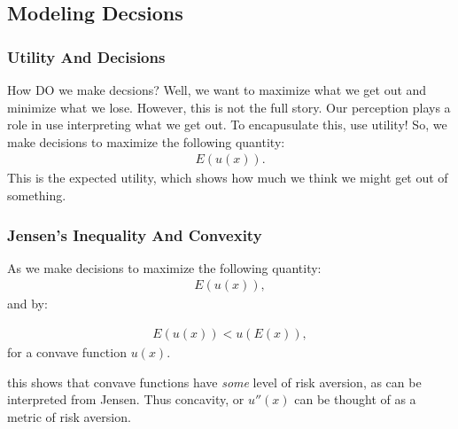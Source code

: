 \documentclass{beamer}
\begin{document}
    \subsection{Modeling Decsions}
        \begin{frame}
            \frametitle{Utility And Decisions}
                How DO we make decsions? Well, we want to maximize what we get out and minimize what we lose. However, this is not the full story. \pause
                Our perception plays a role in use interpreting what we get out. To encapusulate this, use utility! So, we make decisions to maximize the following
                quantity:
                \begin{align*}
                    E(u(x)).
                \end{align*}
                \pause This is the expected utility, which shows how much we think we might get out of something.
        \end{frame}
        \begin{frame}
            \frametitle{Jensen's Inequality And Convexity}
                As we make decisions to maximize the following
                quantity:
                \begin{align*}
                    E(u(x)),
                \end{align*}
                \pause and by:
                \begin{theorem}
                    \begin{align*}
                        E(u(x)) < u(E(x)),
                    \end{align*}
                    for a convave function $u(x)$.
                \end{theorem}
                \pause this shows that convave functions have \textit{some} level of risk aversion, as can be interpreted from Jensen.
                Thus concavity, or $u''(x)$ can be thought of as a metric of risk aversion.
        \end{frame}
\end{document}
